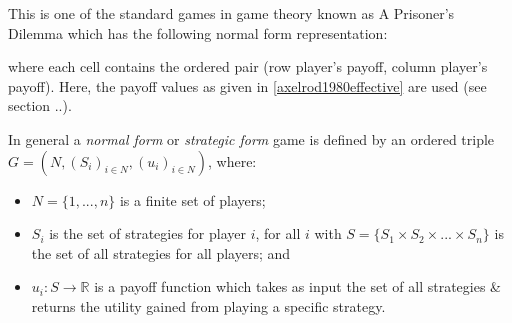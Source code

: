 This is one of the standard games in game theory known as A Prisoner's Dilemma
which has the following normal form representation:

where each cell contains the ordered pair (row player's payoff, column player's
payoff). Here, the payoff values as given in \ref{axelrod1980effective} are used
(see section ..).

In general a \textit{normal form} or \textit{strategic form} game is defined by
an ordered triple $G = (N, (S_i)_{i \in N}, (u_i)_{i \in N})$, where:
\begin{itemize}
    \item $N = \{1, ..., n\}$ is a finite set of players;
    \item $S_i$ is the set of strategies for player $i$, for all $i$ with $S =
        \{S_1 \times S_2 \times ... \times S_n\}$ is the set of all strategies
        for all players; and
    \item $u_i : S \to \mathbb{R}$ is a payoff function which takes as input the
    set of all strategies & returns the utility gained from playing a specific strategy.
\end{itemize}

